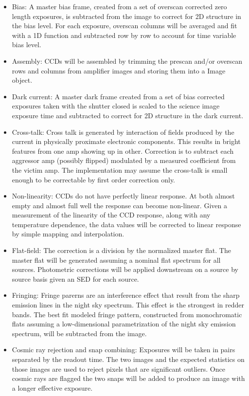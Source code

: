 \documentclass[12pt]{article}
\begin{document}
\begin{itemize}
\item Bias: A master bias frame, created from a set of overscan corrected zero length exposures, is subtracted from the image to correct for 2D structure in the bias level. For each exposure, overscan columns will be averaged and fit with a 1D function and subtracted row by row to account for time variable bias level.

\item Assembly: CCDs will be assembled by trimming the prescan and/or overscan rows and columns from amplifier images and storing them into a Image object.

\item Dark current: A master dark frame created from a set of bias corrected exposures taken with the shutter closed is scaled to the science image exposure time and subtracted to correct for 2D structure in the dark current.

\item Cross-talk: Cross talk is generated by interaction of fields produced by the current in physically proximate electronic components. This results in bright features from one amp showing up in other. Correction is to subtract each aggressor amp (possibly flipped) modulated by a measured coefficient from the victim amp. The implementation may assume the cross-talk is small enough to be correctable by first order correction only.

\item Non-linearity: CCDs do not have perfectly linear response. At both almost empty and almost full well the response can become non-linear. Given a measurement of the linearity of the CCD response, along with any temperature dependence, the data values will be corrected to linear response by simple mapping and interpolation.

\item Flat-field: The correction is a division by the normalized master flat. The master flat will be generated assuming a nominal flat spectrum for all sources. Photometric corrections will be applied downstream on a source by source basis given an SED for each source.

\item Fringing: Fringe parerns are an interference effect that result from the sharp emission lines in the night sky spectrum. This effect is the strongest in redder bands. The best fit modeled fringe pattern, constructed from monochromatic flats assuming a low-dimensional parametrization of the night sky emission spectrum, will be subtracted from the image.

\item Cosmic ray rejection and snap combining: Exposures will be taken in pairs separated by the readout time. The two images and the expected statistics on those images are used to reject pixels that are significant outliers. Once cosmic rays are flagged the two snaps will be added to produce an image with a longer effective exposure.  %
\end{itemize}
\end{document}
